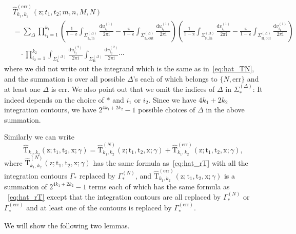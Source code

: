 \documentclass{article}
\numberwithin{equation}{section}
\newcommand{\ddbar}[2]{\frac{{\mathrm d}#1}{2\pi {\mathrm i}#2}}
\newcommand{\exe}{\mathrm{err}}
\newcommand{\inn}{\mathrm{in}}
\newcommand{\LL}{\mathrm{L}}
\newcommand{\out}{\mathrm{out}}
\newcommand{\RR}{\mathrm{R}}
\begin{document}
\begin{equation}
	\label{eq:hat_Texe}
	\begin{split}
		&\hat T_{k_1,k_2}^{(\exe)}(\mathrm{z};t_1,t_2;m,n,M,N)\\
		&=
		\sum_{\Delta}
		\prod_{i_1=1}^{k_1}     
		\left(  \frac{1}{1-\mathrm{z}} \int_{\Sigma_{\LL,\inn}^{(\Delta)}} 	    
		\ddbar{u^{(1)}_{i_1}}{}   
		-\frac{\mathrm{z}}{1-\mathrm{z}} \int_{\Sigma_{\LL,\out}^{(\Delta)}} \ddbar{u^{(1)}_{i_1}}{}
		\right)
		\left(  \frac{1}{1-\mathrm{z}}  \int_{\Sigma_{\RR,\inn}^{(\Delta)}}  
		\ddbar{v^{(1)}_{i_1}}{}
		-\frac{\mathrm{z}}{1-\mathrm{z}}   \int_{\Sigma_{\RR,\out}^{(\Delta)}}
		\ddbar{v^{(1)}_{i_1}}{}
		\right)
		\\
		&\quad \cdot 
		\prod_{i_2=1}^{k_2}  
		\int_{\Sigma_\LL^{(\Delta)}} \ddbar{u^{(2)}_{i_2}}{} 
		\int_{\Sigma_\RR^{(\Delta)}} \ddbar{v^{(2)}_{i_2}}{} 
		\cdots
	\end{split}
\end{equation}
where we did not write out the integrand which is the same as in~\eqref{eq:hat_TN}, and the summation is over all possible $\Delta$'s each of which belongs to $\{N,\exe\}$ and at least one $\Delta$ is $\exe$. We also point out that we omit the indices of $\Delta$ in $\Sigma_*^{(\Delta)}$: It indeed depends on the choice of $*$ and $i_1$ or $i_2$. Since we have $4k_1+2k_2$ integration contours, we have $2^{4k_1+2k_2}-1$ possible choices of $\Delta$ in the above summation.


Similarly we can write
\begin{equation*}
	\mathrm{\hat T}_{k_1,k_2}(\mathrm{z};\mathrm{t}_1,\mathrm{t}_2,\mathrm{x};\gamma)
	=\mathrm{\hat T}_{k_1,k_2}^{(N)}(\mathrm{z};\mathrm{t}_1,\mathrm{t}_2,\mathrm{x};\gamma)
	+
	\mathrm{\hat T}_{k_1,k_2}^{(\exe)}(\mathrm{z};\mathrm{t}_1,\mathrm{t}_2,\mathrm{x};\gamma),
\end{equation*}
where $\mathrm{\hat T}_{k_1,k_2}^{(N)}(\mathrm{z};\mathrm{t}_1,\mathrm{t}_2,\mathrm{x};\gamma)$ has the same formula as~\eqref{eq:hat_rT} with all the integration contours $\Gamma_*$ replaced by $\Gamma_*^{(N)}$, and $\mathrm{\hat T}_{k_1,k_2}^{(\exe)}(\mathrm{z};\mathrm{t}_1,\mathrm{t}_2,\mathrm{x};\gamma)$ is a summation of $2^{4k_1+2k_2}-1$ terms each of which has the same formula as ~\eqref{eq:hat_rT} except that the integration contours are all replaced by $\Gamma_*^{(N)}$ or $\Gamma^{(\exe)}_*$ and at least one of the contours is replaced by $\Gamma^{(\exe)}_*$.

We will show the following two lemmas.
\end{document}
